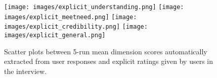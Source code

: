 \begin{figure*}
\centering
    \texttt{[image: images/explicit\_understanding.png]}
    \texttt{[image: images/explicit\_meetneed.png]}
    \texttt{[image: images/explicit\_credibility.png]}
    \texttt{[image: images/explicit\_general.png]}
    \caption{Scatter plots between 5-run mean dimension scores automatically extracted from user responses and explicit ratings given by users in the interview.\label{fig:scatter_coor}}
\end{figure*}